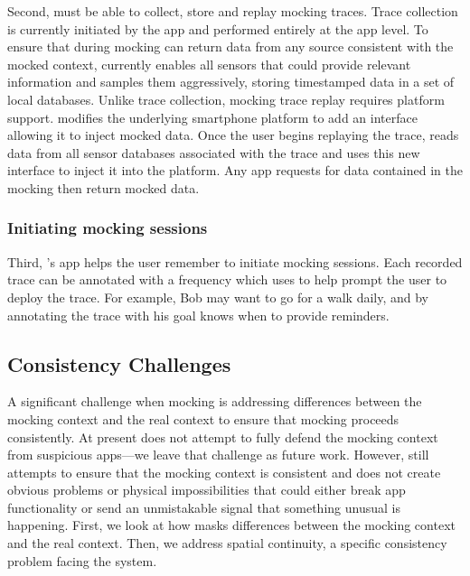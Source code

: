 Second, \PocketMocker{} must be able to collect, store and replay mocking
traces. Trace collection is currently initiated by the \PocketMocker{} app and
performed entirely at the app level. To ensure that during mocking
\PocketMocker{} can return data from any source consistent with the mocked
context, \PocketMocker{} currently enables all sensors that could provide
relevant information and samples them aggressively, storing timestamped data in
a set of local databases. Unlike trace collection, mocking trace replay
requires platform support.  \PocketMocker{} modifies the underlying smartphone
platform to add an interface allowing it to inject mocked data. Once the user
begins replaying the trace, \PocketMocker{} reads data from all sensor
databases associated with the trace and uses this new interface to inject it
into the platform.  Any app requests for data contained in the mocking then
return mocked data.

\subsubsection{Initiating mocking sessions}

Third, \PocketMocker{}'s app helps the user remember to initiate mocking
sessions. Each recorded trace can be annotated with a frequency which
\PocketMocker{} uses to help prompt the user to deploy the trace. For
example, Bob may want to go for a walk daily, and by annotating the trace
with his goal \PocketMocker{} knows when to provide reminders.

\subsection{Consistency Challenges}

A significant challenge when mocking is addressing differences between the
mocking context and the real context to ensure that mocking proceeds
consistently. At present \PocketMocker{} does not attempt to fully defend the
mocking context from suspicious apps---we leave that challenge as future
work. However, \PocketMocker{} still attempts to ensure that the mocking
context is consistent and does not create obvious problems or physical
impossibilities that could either break app functionality or send an
unmistakable signal that something unusual is happening. First, we look at
how \PocketMocker{} masks differences between the mocking context and the
real context. Then, we address spatial continuity, a specific consistency
problem facing the \PocketMocker{} system.

